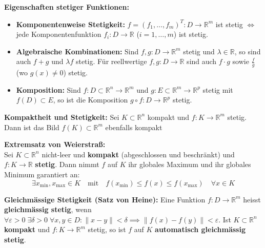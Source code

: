 \begin{theorem}
    \textbf{Eigenschaften stetiger Funktionen:}
    \begin{itemize}
        \item \textbf{Komponentenweise Stetigkeit:} $f = (f_1, \dots, f_m)^T: D \to \mathbb{R}^m$ ist stetig $\iff$ jede Komponentenfunktion $f_i: D \to \mathbb{R}$ ($i = 1, \dots, m$) ist stetig.
        \item \textbf{Algebraische Kombinationen:} Sind $f, g: D \to \mathbb{R}^m$ stetig und $\lambda \in \mathbb{R}$, so sind auch $f + g$ und $\lambda f$ stetig. Für reellwertige $f, g: D \to \mathbb{R}$ sind auch $f \cdot g$ sowie $\frac{f}{g}$ (wo $g(x) \neq 0$) stetig.
        \item \textbf{Komposition:} Sind $f: D \subset \mathbb{R}^n \to \mathbb{R}^m$ und $g: E \subset \mathbb{R}^m \to \mathbb{R}^p$ stetig mit $f(D) \subset E$, so ist die Komposition $g \circ f: D \to \mathbb{R}^p$ stetig.
    \end{itemize}
\end{theorem}

\begin{theorem}
    \textbf{Kompaktheit und Stetigkeit:} Sei $K \subset \mathbb{R}^n$ kompakt und $f: K \to \mathbb{R}^m$ stetig.
    Dann ist das Bild $f(K) \subset \mathbb{R}^m$ ebenfalls kompakt
\end{theorem}

\begin{theorem}
    \textbf{Extremsatz von Weierstraß:} \\
    Sei $K \subset \mathbb{R}^n$ nicht-leer und \textbf{kompakt} (abgeschlossen und beschränkt) und $f: K \to \mathbb{R}$ \textbf{stetig}.
    Dann nimmt $f$ auf $K$ ihr globales Maximum und ihr globales Minimum garantiert an:
    $$ \exists x_{\min}, x_{\max} \in K \quad \text{mit} \quad f(x_{\min}) \le f(x) \le f(x_{\max}) \quad \forall x \in K $$
\end{theorem}

\begin{theorem}
    \textbf{Gleichmässige Stetigkeit (Satz von Heine):} Eine Funktion $f: D \to \mathbb{R}^m$ heisst \textbf{gleichmässig stetig}, wenn $\forall \varepsilon > 0 \; \exists \delta > 0 \; \forall x, y \in D: \|x - y\| < \delta \implies \|f(x) - f(y)\| < \varepsilon$.
    Ist $K \subset \mathbb{R}^n$ \textbf{kompakt} und $f: K \to \mathbb{R}^m$ stetig, so ist $f$ auf $K$ \textbf{automatisch gleichmässig stetig}.
\end{theorem}